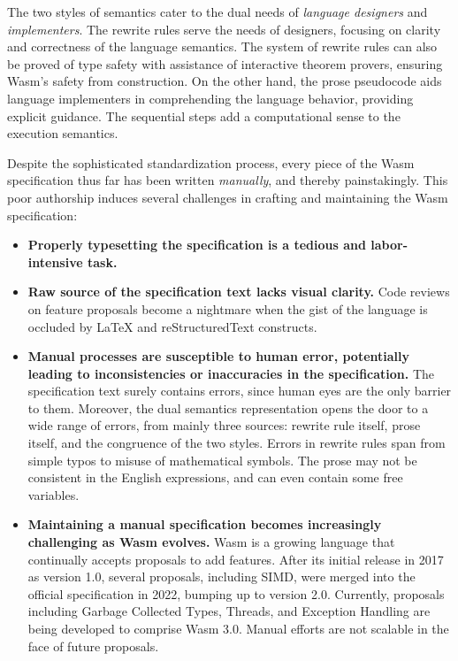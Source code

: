 The two styles of semantics cater to the dual needs of \textit{language
designers} and \textit{implementers}.  The rewrite rules serve the needs of
designers, focusing on clarity and correctness of the language semantics.  The
system of rewrite rules can also be proved of type safety with assistance of
interactive theorem provers, ensuring Wasm's safety from construction.  On the
other hand, the prose pseudocode aids language implementers in comprehending
the language behavior, providing explicit guidance.  The sequential steps add a
computational sense to the execution semantics.

Despite the sophisticated standardization process, every piece of the Wasm
specification thus far has been written \textit{manually}, and thereby
painstakingly.  This poor authorship induces several challenges in
crafting and maintaining the Wasm specification:
\begin{itemize}
  \item
    \textbf{Properly typesetting the specification is a tedious and labor-intensive task.}
  \item
    \textbf{Raw source of the specification text lacks visual clarity.}
    Code reviews on feature proposals become a nightmare when the gist of the language is occluded by LaTeX and reStructuredText constructs.
  \item
    \textbf{Manual processes are susceptible to human error, potentially leading to inconsistencies or inaccuracies in the specification.}
    The specification text surely contains errors, since human eyes are the only barrier to them.
    Moreover, the dual semantics representation opens the door to a wide range of errors, from mainly three sources: rewrite rule itself, prose itself, and the congruence of the two styles.
    Errors in rewrite rules span from simple typos to misuse of mathematical symbols.
    The prose may not be consistent in the English expressions, and can even contain some free variables.
  \item
    \textbf{Maintaining a manual specification becomes increasingly challenging as Wasm evolves.}
    Wasm is a growing language that continually accepts proposals to add features.
    After its initial release in 2017 as version 1.0, several proposals, including SIMD, were merged into the official specification in 2022, bumping up to version 2.0.
    Currently, proposals including Garbage Collected Types, Threads, and Exception Handling are being developed to comprise Wasm 3.0.
    Manual efforts are not scalable in the face of future proposals.
\end{itemize}


